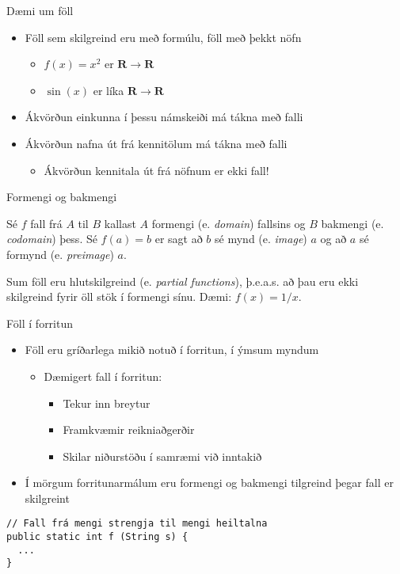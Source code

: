 \documentclass{beamer}
\begin{document}
\begin{frame}{Dæmi um föll}
\begin{itemize}
 \item Föll sem skilgreind eru með formúlu, föll með þekkt nöfn
 \begin{itemize}
  \item $f(x) = x^2$ er $\mathbf{R} \to \mathbf{R}$
  \item $\sin(x)$ er líka $\mathbf{R} \to \mathbf{R}$
 \end{itemize}
 \item Ákvörðun einkunna í þessu námskeiði má tákna með falli
 \item Ákvörðun nafna út frá kennitölum má tákna með falli \pause
 \begin{itemize}
  \item Ákvörðun kennitala út frá nöfnum er ekki fall!
 \end{itemize}
\end{itemize}
\end{frame}

\begin{frame}{Formengi og bakmengi}
\begin{tcolorbox}[title=Formengi og bakmengi]
Sé $f$ fall frá $A$ til $B$ kallast $A$ formengi (e. \emph{domain}) fallsins og $B$ bakmengi (e. \emph{codomain}) þess. Sé $f(a) = b$ er sagt að $b$ sé mynd (e. \emph{image}) $a$ og að $a$ sé formynd (e. \emph{preimage}) $a$.
\end{tcolorbox}
Sum föll eru hlutskilgreind (e. \emph{partial functions}), þ.e.a.s. að þau eru ekki skilgreind fyrir öll stök í formengi sínu. Dæmi: $f(x) = 1/x$.
\end{frame}

\begin{frame}[fragile]{Föll í forritun}
\begin{itemize}
 \item Föll eru gríðarlega mikið notuð í forritun, í ýmsum myndum
 \begin{itemize}
  \item Dæmigert fall í forritun:
  \begin{itemize}
   \item Tekur inn breytur
   \item Framkvæmir reikniaðgerðir
   \item Skilar niðurstöðu í samræmi við inntakið 
  \end{itemize}
 \end{itemize}
 \item Í mörgum forritunarmálum eru formengi og bakmengi tilgreind þegar fall er skilgreint
\end{itemize}
\begin{verbatim}
// Fall frá mengi strengja til mengi heiltalna
public static int f (String s) {
  ...
}
\end{verbatim}

\end{frame}
\end{document}
